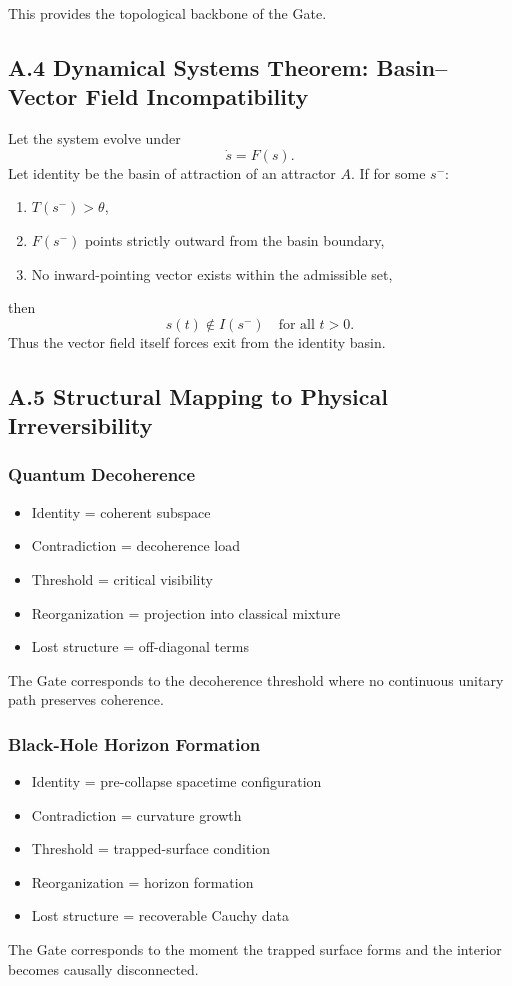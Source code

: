 \documentclass[12pt]{article}
\begin{document}
This provides the topological backbone of the Gate.

\subsection{A.4 Dynamical Systems Theorem: Basin–Vector Field Incompatibility}

Let the system evolve under
\[
\dot{s} = F(s).
\]
Let identity be the basin of attraction of an attractor $A$.  
If for some $s^-$:
\begin{enumerate}
\item $T(s^-) > \theta$,
\item $F(s^-)$ points strictly outward from the basin boundary,
\item No inward-pointing vector exists within the admissible set,
\end{enumerate}
then
\[
s(t) \notin I(s^-) \quad \text{for all } t>0.
\]
Thus the vector field itself forces exit from the identity basin.

\subsection{A.5 Structural Mapping to Physical Irreversibility}

\subsubsection*{Quantum Decoherence}
\begin{itemize}
\item Identity = coherent subspace
\item Contradiction = decoherence load
\item Threshold = critical visibility
\item Reorganization = projection into classical mixture
\item Lost structure = off-diagonal terms
\end{itemize}

The Gate corresponds to the decoherence threshold where no continuous unitary path preserves coherence.

\subsubsection*{Black-Hole Horizon Formation}
\begin{itemize}
\item Identity = pre-collapse spacetime configuration
\item Contradiction = curvature growth
\item Threshold = trapped-surface condition
\item Reorganization = horizon formation
\item Lost structure = recoverable Cauchy data
\end{itemize}

The Gate corresponds to the moment the trapped surface forms and the interior becomes causally disconnected.
\end{document}
